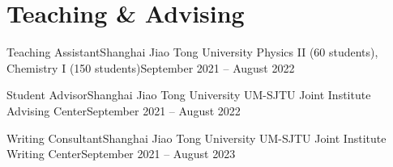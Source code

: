 \documentclass[a4paper,11pt]{article}
\begin{document}
\resumeSubHeadingListEnd
\vspace{-6mm}



\section{\textbf{Teaching \& Advising}}
\vspace{-0.4mm}
\resumeSubHeadingListStart

\resumeSubheading
{Teaching Assistant}{Shanghai Jiao Tong University}
{Physics II (60 students), Chemistry I (150 students)}{September 2021 -- August 2022}

\resumeSubheading
{Student Advisor}{Shanghai Jiao Tong University}
{UM-SJTU Joint Institute Advising Center}{September 2021 -- August 2022}

\resumeSubheading
{Writing Consultant}{Shanghai Jiao Tong University}
{UM-SJTU Joint Institute Writing Center}{September 2021 -- August 2023}

\resumeSubHeadingListEnd







\end{document}
